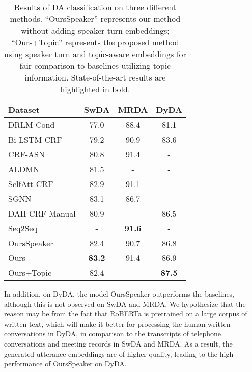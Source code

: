 \documentclass[11pt]{article}
\begin{document}
\begin{table}[ht]
\centering
\begin{small}
\begin{tabular}{lccc}
\hline
\textbf{Dataset} & \textbf{SwDA} & \textbf{MRDA} & \textbf{DyDA} \\ \hline
DRLM-Cond       & 77.0          & 88.4          & 81.1          \\
Bi-LSTM-CRF     & 79.2          & 90.9          & 83.6          \\
CRF-ASN         & 80.8          & 91.4 & -             \\
ALDMN           & 81.5          & -             & -             \\
SelfAtt-CRF     & 82.9          & 91.1          & -             \\
SGNN            & 83.1          & 86.7          & -             \\
DAH-CRF-Manual   & 80.9          & -             & 86.5          \\ 
Seq2Seq            & -          & \textbf{91.6}          & -             \\ \hline
OursSpeaker & 82.4          & 90.7          & 86.8          \\
Ours             & \textbf{83.2} & 91.4 & 86.9          \\
Ours+Topic      & 82.4             & -             & \textbf{87.5} \\ \hline
\end{tabular}
\end{small}
\caption{Results of DA classification on three different methods. ``OursSpeaker'' represents our method without adding speaker turn embeddings; ``Ours+Topic'' represents the proposed method using speaker turn and topic-aware embeddings for fair comparison to baselines utilizing topic information. State-of-the-art results are highlighted in bold.}
\label{tab:results}
\end{table}

In addition, on DyDA, the model OursSpeaker outperforms the baselines, although this is not observed on SwDA and MRDA. We hypothesize that the reason may be from the fact that RoBERTa \cite{liu2019roberta} is pretrained on a large corpus of written text, which will make it better for processing the human-written conversations in DyDA, in comparison to the transcripts of telephone conversations and meeting records in SwDA and MRDA. As a result, the generated utterance embeddings are of higher quality, leading to the high performance of OursSpeaker on DyDA.
\end{document}
